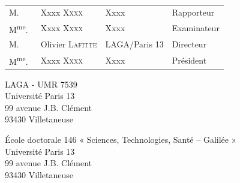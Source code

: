 \begin{titlepage}
\begin{center}
{\Large
\begin{tabular}{l@{\hskip 0cm}lll}
M.&Xxxx \textsc{Xxxx} & Xxxx & Rapporteur\\
M\textsuperscript{me}.~&Xxxx \textsc{Xxxx} & Xxxx & Examinateur\\
M.&Olivier \textsc{Lafitte} & LAGA/Paris 13 & Directeur\\
M\textsuperscript{me}.~&Xxxx \textsc{Xxxx} & Xxxx & Président\\
\end{tabular}
}

\end{center}

\newpage
\thispagestyle{empty}
\vspace*{\fill}

\noindent
\begin{center}
\begin{minipage}[t]{0.5\textwidth}
LAGA - UMR 7539\\
Université Paris 13\\
99 avenue J.B. Clément\\
93430 Villetaneuse
\end{minipage}%
%
\hfill%
%
\begin{minipage}[t]{0.5\textwidth}
École doctorale 146 « Sciences, Technologies, Santé – Galilée »\\
Université Paris 13\\
99 avenue J.B. Clément\\
93430 Villetaneuse
\end{minipage}
\end{center}



\end{titlepage}
\hypersetup{pageanchor=true}
\cleardoublepage